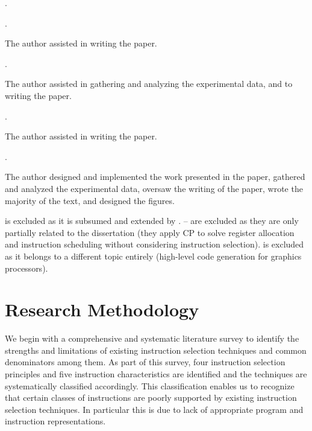 \begin{publications}[resume]
  \item {}
    .
  \item {}
    .
    \begin{authorsContribution}
      The author assisted in writing the paper.
    \end{authorsContribution}
  \item {}
    .
    \begin{authorsContribution}
      The author assisted in gathering and analyzing the experimental data, and
      to writing the paper.
    \end{authorsContribution}
  \item {}
    .
    \begin{authorsContribution}
      The author assisted in writing the paper.
    \end{authorsContribution}
  \item {}
    .
    \begin{authorsContribution}
      The author designed and implemented the work presented in the paper,
      gathered and analyzed the experimental data, oversaw the writing of the
      paper, wrote the majority of the text, and designed the figures.
    \end{authorsContribution}
\end{publications}
%
 is excluded as it is subsumed and extended by
. -- are
excluded as they are only partially related to the dissertation (they apply
\glsdesc{CP} to solve \gls{register allocation} and \gls{instruction scheduling}
without considering \gls{instruction selection}).  is
excluded as it belongs to a different topic entirely (high-level code generation
for graphics processors).


\section{Research Methodology}

We begin with a comprehensive and systematic literature survey to identify the
strengths and limitations of existing \gls{instruction selection} techniques and
common denominators among them.
%
As part of this survey, four \gls{instruction selection} \glspl{principle} and
five \glspl{instruction characteristic} are identified and the techniques are
systematically classified accordingly.
%
This classification enables us to recognize that certain classes of
\glspl{instruction} are poorly supported by existing \gls{instruction selection}
techniques.
%
In particular this is due to lack of appropriate \gls{program} and
\gls{instruction} representations.

